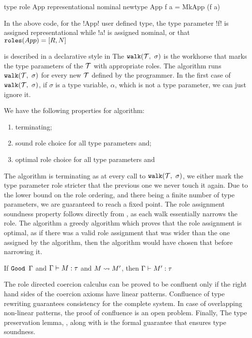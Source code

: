 \documentclass[screen,nonacm]{acmart}
\begin{document}
\begin{CenteredBox}
\begin{code}
type role App representational nominal
newtype App f a = MkApp (f a)
\end{code}
\end{CenteredBox}
In the above code, for the !App! user defined type, the type parameter !f! is assigned representational while !a! is assigned nominal, or that $\texttt{roles}(App) = [R, N]$

\RoleInfer is described in a declarative style in 
The $\texttt{walk}(\mathcal{T},~\sigma)$ is the workhorse that marks the type parameters of the $\mathcal{T}$ with appropriate roles. The algorithm \RoleInfer runs $\texttt{walk}(\mathcal{T},~\sigma)$ for every new $\mathcal{T}$ defined by the programmer. In the first case of $\texttt{walk}(\mathcal{T},~\sigma)$, if $\sigma$ is a type variable, $\alpha$, which is not a type parameter, we can just ignore it.

We have the following properties for \RoleInfer algorithm:
\begin{enumerate}
\item terminating;
\item sound role choice for all type parameters and;
\item optimal role choice for all type parameters and
\end{enumerate}

The algorithm is terminating as at every call to $\texttt{walk}(\mathcal{T},~\sigma)$, we either mark the type parameter role stricter that the previous one we never touch it again. Due to the lower bound on the role ordering, and there being a finite number of type parameters, we are guaranteed to reach a fixed point. The role assignment soundness property follows directly from , as each walk essentially narrows the role. The algorithm a greedy algorithm which proves that the role assignment is optimal, as if there was a valid role assignment that was wider than the one assigned by the algorithm, then the algorithm would have chosen that before narrowing it.

\begin{lemma}\label{lem:sfr-preservation}
If $\texttt{Good~}\Gamma$ and $\Gamma \vdash M : \tau$ and $M \rightsquigarrow M'$, then $\Gamma \vdash M' : \tau$
\end{lemma}
The role directed coercion calculus can be proved to be confluent only if the right hand sides of the coercion axioms have linear patterns. Confluence of type rewriting guarantees consistency for the complete system. In case of overlapping non-linear patterns, the proof of confluence is an open problem\cite{mizuhito_rta_1995}.
Finally, The type preservation lemma, ,
along with  is the formal guarantee that
ensures type soundness.
\end{document}
